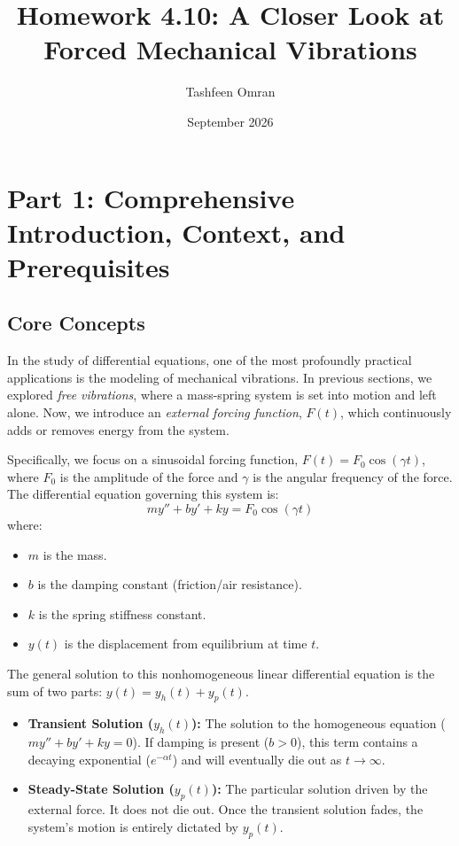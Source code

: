 \documentclass[11pt]{article}
\title{\textbf{Homework 4.10: A Closer Look at Forced Mechanical Vibrations}}
\author{Tashfeen Omran}
\date{September 2026}
\begin{document}
\maketitle
\tableofcontents
\newpage

\section{Part 1: Comprehensive Introduction, Context, and Prerequisites}

\subsection{Core Concepts}
In the study of differential equations, one of the most profoundly practical applications is the modeling of mechanical vibrations. In previous sections, we explored \textit{free vibrations}, where a mass-spring system is set into motion and left alone. Now, we introduce an \textit{external forcing function}, $F(t)$, which continuously adds or removes energy from the system. 

Specifically, we focus on a sinusoidal forcing function, $F(t) = F_0 \cos(\gamma t)$, where $F_0$ is the amplitude of the force and $\gamma$ is the angular frequency of the force. The differential equation governing this system is:
\[ m y'' + b y' + k y = F_0 \cos(\gamma t) \]
where:
\begin{itemize}
    \item $m$ is the mass.
    \item $b$ is the damping constant (friction/air resistance).
    \item $k$ is the spring stiffness constant.
    \item $y(t)$ is the displacement from equilibrium at time $t$.
\end{itemize}

The general solution to this nonhomogeneous linear differential equation is the sum of two parts: $y(t) = y_h(t) + y_p(t)$.
\begin{itemize}
    \item \textbf{Transient Solution ($y_h(t)$):} The solution to the homogeneous equation ($m y'' + b y' + k y = 0$). If damping is present ($b > 0$), this term contains a decaying exponential ($e^{-\alpha t}$) and will eventually die out as $t \to \infty$.
    \item \textbf{Steady-State Solution ($y_p(t)$):} The particular solution driven by the external force. It does not die out. Once the transient solution fades, the system's motion is entirely dictated by $y_p(t)$.
\end{itemize}
\end{document}
